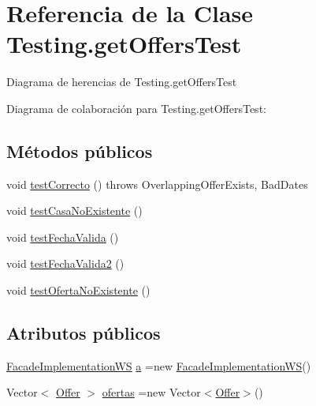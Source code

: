\hypertarget{class_testing_1_1get_offers_test}{}\section{Referencia de la Clase Testing.\+get\+Offers\+Test}
\label{class_testing_1_1get_offers_test}


Diagrama de herencias de Testing.\+get\+Offers\+Test


Diagrama de colaboración para Testing.\+get\+Offers\+Test\+:
\subsection*{Métodos públicos}
\begin{DoxyCompactItemize}
\item 
void \mbox{\hyperlink{class_testing_1_1get_offers_test_a5e5ead486850d6a541b72cc97dd2efe5}{test\+Correcto}} ()  throws Overlapping\+Offer\+Exists, Bad\+Dates 
\item 
void \mbox{\hyperlink{class_testing_1_1get_offers_test_aab84a688f8f352be6ed2ec1240f5e350}{test\+Casa\+No\+Existente}} ()
\item 
void \mbox{\hyperlink{class_testing_1_1get_offers_test_a9ad0a640a38332759435e89eb8f891f5}{test\+Fecha\+Valida}} ()
\item 
void \mbox{\hyperlink{class_testing_1_1get_offers_test_a71e1b54d6cb2a107543498540ea56803}{test\+Fecha\+Valida2}} ()
\item 
void \mbox{\hyperlink{class_testing_1_1get_offers_test_a21fd531ddb00f1073b1068e5ec32064b}{test\+Oferta\+No\+Existente}} ()
\end{DoxyCompactItemize}
\subsection*{Atributos públicos}
\begin{DoxyCompactItemize}
\item 
\mbox{\hyperlink{classbusiness_logic_1_1_facade_implementation_w_s}{Facade\+Implementation\+WS}} \mbox{\hyperlink{class_testing_1_1get_offers_test_a5a94d6f9909d85742e140e7030f81d5a}{a}} =new \mbox{\hyperlink{classbusiness_logic_1_1_facade_implementation_w_s}{Facade\+Implementation\+WS}}()
\item 
Vector$<$ \mbox{\hyperlink{classdomain_1_1_offer}{Offer}} $>$ \mbox{\hyperlink{class_testing_1_1get_offers_test_a2031e3e284394c2ae6a3fbeae0e0c539}{ofertas}} =new Vector$<$\mbox{\hyperlink{classdomain_1_1_offer}{Offer}}$>$()
\end{DoxyCompactItemize}


